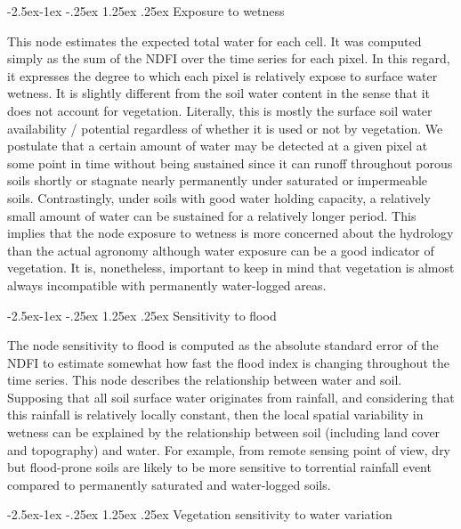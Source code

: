 \documentclass[12pt,oneside]{article}
\makeatletter
\renewcommand\paragraph{\@startsection{paragraph}{4}{\z@}%
            {-2.5ex\@plus -1ex \@minus -.25ex}%
            {1.25ex \@plus .25ex}%
            {\normalfont\normalsize\bfseries}}
\makeatother
\begin{document}
\hypertarget{I.5.2.2}{%
\paragraph{Exposure to wetness}\label{I.5.2.2}}

This node estimates the expected total water for each cell. It was
computed simply as the sum of the NDFI over the time series for each
pixel. In this regard, it expresses the degree to which each pixel is
relatively expose to surface water wetness. It is slightly different
from the soil water content in the sense that it does not account for
vegetation. Literally, this is mostly the surface soil water
availability / potential regardless of whether it is used or not by
vegetation. We postulate that a certain amount of water may be detected
at a given pixel at some point in time without being sustained since it
can runoff throughout porous soils shortly or stagnate nearly
permanently under saturated or impermeable soils. Contrastingly, under
soils with good water holding capacity, a relatively small amount of
water can be sustained for a relatively longer period. This implies that
the node exposure to wetness is more concerned about the hydrology than
the actual agronomy although water exposure can be a good indicator of
vegetation. It is, nonetheless, important to keep in mind that
vegetation is almost always incompatible with permanently water-logged
areas.

\hypertarget{I.5.2.3}{%
\paragraph{Sensitivity to flood}\label{I.5.2.3}}

The node sensitivity to flood is computed as the absolute standard error
of the NDFI to estimate somewhat how fast the flood index is changing
throughout the time series. This node describes the relationship between
water and soil. Supposing that all soil surface water originates from
rainfall, and considering that this rainfall is relatively locally
constant, then the local spatial variability in wetness can be explained
by the relationship between soil (including land cover and topography)
and water. For example, from remote sensing point of view, dry but
flood-prone soils are likely to be more sensitive to torrential rainfall
event compared to permanently saturated and water-logged soils.

\hypertarget{I.5.2.4}{%
\paragraph{Vegetation sensitivity to water variation}\label{I.5.2.4}}
\end{document}
